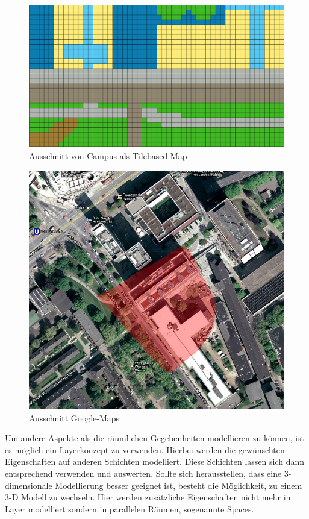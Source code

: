 \documentclass[10pt]{scrartcl}
\begin{document}
      \begin{figure}[htbp]
        \centering
                \includegraphics[scale=0.5]{img/tile_map_campus_pic}
        \caption{Ausschnitt von Campus als \glqq Tilebased Map\grqq{}}
        \label{img:tile_map}
        \end{figure}  
        
        
      \begin{figure}[htbp]
        \centering
                \includegraphics[scale=0.5]{img/google_maps}
        \caption{Ausschnitt Google-Maps}
        \label{img:google_maps}
        \end{figure}  
        
        
        Um andere Aspekte als die räumlichen Gegebenheiten modellieren zu können, ist es möglich ein Layerkonzept zu verwenden. Hierbei werden die gewünschten Eigenschaften auf anderen Schichten modelliert. Diese Schichten lassen sich dann entsprechend verwenden und auswerten.
Sollte sich herausstellen, dass eine 3-dimensionale Modellierung besser geeignet ist, besteht die Möglichkeit, zu einem 3-D Modell zu wechseln. Hier werden zusätzliche Eigenschaften nicht mehr in Layer modelliert sondern in parallelen Räumen, sogenannte Spaces.
\end{document}
